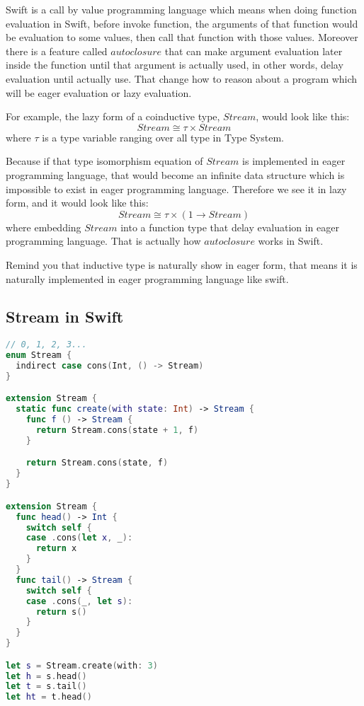 \documentclass{article}
\begin{document}
Swift is a call by value programming language which means when doing function evaluation in Swift, before invoke function, the arguments of that function would be evaluation to some values, then call that function with those values. Moreover there is a feature called $autoclosure$ that can make argument evaluation later inside the function until that argument is actually used, in other words, delay evaluation until actually use. That change how to reason about a program which will be eager evaluation or lazy evaluation.


For example, the lazy form of a coinductive type, $Stream$, would look like this:
\begin{equation*}
Stream \cong \tau \times Stream
\end{equation*}
where $\tau$ is a type variable ranging over all type in Type System.


Because if that type isomorphism equation of $Stream$ is implemented in eager programming language, that would become an infinite data structure which is impossible to exist in eager programming language. Therefore we see it in lazy form, and it would look like this:
\begin{equation*}
Stream \cong \tau \times ( 1 \rightarrow Stream )
\end{equation*}
where embedding $Stream$ into a function type that delay evaluation in eager programming language. That is actually how $autoclosure$ works in Swift.


Remind you that inductive type is naturally show in eager form, that means it is naturally implemented in eager programming language like swift.


\subsection*{Stream in Swift}
\begin{lstlisting}[language=Swift]
// 0, 1, 2, 3...
enum Stream {
  indirect case cons(Int, () -> Stream)
}

extension Stream {
  static func create(with state: Int) -> Stream {
    func f () -> Stream {
      return Stream.cons(state + 1, f)
    }

    return Stream.cons(state, f)
  }
}

extension Stream {
  func head() -> Int {
    switch self {
    case .cons(let x, _):
      return x
    }
  }
  func tail() -> Stream {
    switch self {
    case .cons(_, let s):
      return s()
    }
  }
}

let s = Stream.create(with: 3)
let h = s.head()
let t = s.tail()
let ht = t.head()
\end{lstlisting}
\end{document}
